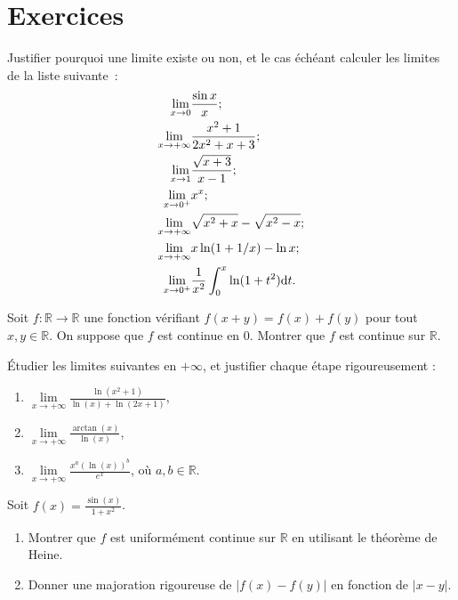 \section{Exercices}
\begin{exercice}
  Justifier pourquoi une limite existe ou non, et le cas échéant calculer les 
  limites de la liste suivante~:
  \begin{align}
    \lim\limits_{x \to 0} & \frac{\sin x}{x};\\
    \lim\limits_{x \to +\infty} & \frac{x^2+1}{2x^2+x+3};\\
    \lim\limits_{x \to 1} & \frac{\sqrt{x+3}}{x-1};\\
    \lim\limits_{x\to 0^{+}} & x^x;\\
    \lim\limits_{x \to +\infty} & \sqrt{x^2+x} - \sqrt{x^2-x};\\
    \lim\limits_{x \to +\infty} & x\ln(1+1/x) - \ln x;\\
    \lim\limits_{x \to 0^{+}} & \frac{1}{x^2} \int_0^x \ln(1+t^2)\mathrm{d} t.
  \end{align}
\end{exercice}
\begin{exercice}
  Soit \(f : \mathbb{R} \to \mathbb{R}\) une fonction vérifiant \(f(x+y) = f(x) 
  + f(y)\) pour tout \(x, y \in \mathbb{R}\). On suppose que \(f\) est continue 
  en \(0\). Montrer que \(f\) est continue sur \(\mathbb{R}\).
\end{exercice}

\begin{exercice}
Étudier les limites suivantes en \(+\infty\), et justifier chaque étape rigoureusement :
\begin{enumerate}
    \item \(\lim\limits_{x \to +\infty} \frac{\ln(x^2+1)}{\ln(x) + \ln(2x+1)}\),
    \item \(\lim\limits_{x \to +\infty} \frac{\arctan(x)}{\ln(x)}\),
    \item \(\lim\limits_{x \to +\infty} \frac{x^a (\ln(x))^b}{e^x}\), où \(a, b \in \mathbb{R}\).
\end{enumerate}
\end{exercice}

\begin{exercice}
Soit \(f(x) = \frac{\sin(x)}{1+x^2}\).
\begin{enumerate}
    \item Montrer que \(f\) est uniformément continue sur \(\mathbb{R}\) en utilisant le théorème de Heine.
    \item Donner une majoration rigoureuse de \(|f(x) - f(y)|\) en fonction de \(|x-y|\).
\end{enumerate}
\end{exercice}

